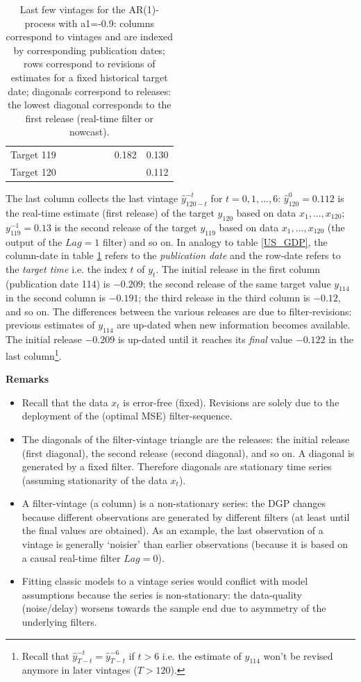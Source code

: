 \documentclass[a4paper]{book}
\begin{document}
\begin{enumerate}
\begin{table}[ht]
\begin{tabular}{rrrrrrrr}
  Target 119 &  &  &  &  &  & 0.182 & 0.130 \\ 
  Target 120 &  &  &  &  &  &  & 0.112 \\ 
   \hline
\end{tabular}
\caption{Last few vintages for the AR(1)-process with a1=-0.9: columns correspond to vintages and are indexed
  by corresponding publication dates; rows correspond to revisions of estimates for a fixed historical target date; diagonals correspond to releases: the lowest diagonal corresponds to the first release (real-time filter or nowcast).} 
\label{vintage_triangle}
\end{table}The last column collects the last vintage $\hat{y}_{120-t}^{-t}$ for $t=0,1,...,6$: $\hat{y}_{120}^{0}=0.112$
is the real-time estimate (first release) of the target $y_{120}$ based on data $x_1,...,x_{120}$; $y_{119}^{-1}=0.13$ is the second release of the target $y_{119}$ based on data $x_1,...,x_{120}$ (the output of the $Lag=1$ filter)
and so on. In analogy to table \ref{US_GDP}, the column-date in table
\ref{vintage_triangle} refers to the \emph{publication date} and the row-date refers to the
\emph{target time} i.e. the index $t$ of $y_t$. The initial release
in the first column (publication date 114) is $-0.209$;  the second release
of the same target value $y_{114}$ in the second column is $-0.191$;
the third release in the third column is $-0.12$, and so on. The differences
between the various releases are due to filter-revisions: previous estimates of  $y_{114}$ are up-dated when new information becomes available. The initial release $-0.209$ is up-dated until it reaches its \emph{final} value $-0.122$ in the last column\footnote{Recall that $\hat{y}_{T-t}^{-t}=\hat{y}_{T-t}^{-6}$ if $t>6$ i.e. the estimate of $y_{114}$ won't be revised anymore in later vintages ($T>120$).}.  
\end{enumerate}
\textbf{Remarks}
\begin{itemize}
\item Recall that the data $x_t$ is error-free (fixed). Revisions are solely due to the deployment of the (optimal MSE) filter-sequence.
\item The diagonals of the filter-vintage triangle are the releases: the initial release (first diagonal), the second release (second diagonal), and so on. A diagonal is generated by a fixed filter. Therefore diagonals are stationary time series (assuming stationarity of the data $x_t$).
\item A filter-vintage (a column) is a non-stationary series: the DGP changes because different observations are generated by different filters (at least until the final values are obtained). As an example, the last observation of a vintage is generally `noisier' than earlier observations (because it is based on a causal real-time filter $Lag=0$).
\item Fitting classic models to a vintage series would conflict with model assumptions because the series is non-stationary: the data-quality (noise/delay) worsens towards the sample end due to asymmetry of the underlying filters.
\end{itemize}
\end{document}
